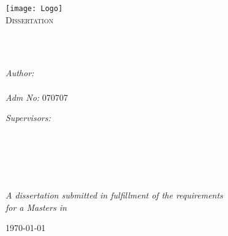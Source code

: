 \documentclass[
  11pt,
  oneside,
  english,
  doublespacing,
  headsepline,
]{MastersDoctoralThesis}
\author{\href{https://bonfacemunyoki.com}{Bonface Munyoki Kilyungi}}
\begin{document}
\frontmatter

\pagestyle{plain}

\begin{titlepage}
\begin{center}

\vspace*{.06\textheight}
\texttt{[image: Logo]}\\ %
\textsc{\Large Dissertation}\\[0.5cm] %

\HRule \\[0.4cm] %
{\huge \bfseries \ttitle\par}\vspace{0.4cm} %
\HRule \\[1.3cm] %

\begin{minipage}[t]{0.4\textwidth}
\begin{flushleft} \large
\emph{Author:}\\
\href{https://bonfacemunyoki.com}{\authorname} \\
\emph{Adm No:} 070707
\end{flushleft}
\end{minipage}
\begin{minipage}[t]{0.4\textwidth}
  \begin{flushright} \large
    \emph{Supervisors:} \\
    \supnamei\\
    \supnameii\\
    \supnameiii\\
    \supnameiv
\end{flushright}
\end{minipage}\\[1cm]

\vfill

\large \textit{A dissertation submitted in fulfillment of the requirements\\ for a Masters in \degreename}\\

\vfill

{\large \today} %

\end{center}

\end{titlepage}
\end{document}
